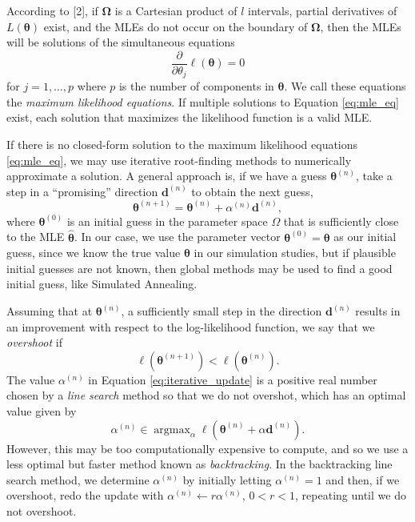 \documentclass[
]{article}
\begin{document}
According to {[}2{]}, if \(\boldsymbol{\Omega}\) is a Cartesian product
of \(l\) intervals, partial derivatives of \(L(\boldsymbol{\theta})\)
exist, and the MLEs do not occur on the boundary of
\(\boldsymbol{\Omega}\), then the MLEs will be solutions of the
simultaneous equations \begin{equation}
\label{eq:mle_eq}
\frac{\partial}{\partial \theta_j} \ell(\boldsymbol{\theta}) = 0
\end{equation} for \(j=1,\ldots,p\) where \(p\) is the number of
components in \(\boldsymbol{\theta}\). We call these equations the
\emph{maximum likelihood equations}. If multiple solutions to Equation
\eqref{eq:mle_eq} exist, each solution that maximizes the likelihood
function is a valid MLE.

If there is no closed-form solution to the maximum likelihood equations
\eqref{eq:mle_eq}, we may use iterative root-finding methods to
numerically approximate a solution. A general approach is, if we have a
guess \(\boldsymbol{\theta}^{(n)}\), take a step in a ``promising''
direction \(\boldsymbol{d}^{(n)}\) to obtain the next guess,
\begin{equation}
\label{eq:iterative_update}
\boldsymbol{\theta}^{(n+1)} = \boldsymbol{\theta}^{(n)} + \alpha^{(n)} \boldsymbol{d}^{(n)},
\end{equation} where \(\boldsymbol{\theta}^{(0)}\) is an initial guess
in the parameter space \(\Omega\) that is sufficiently close to the MLE
\(\hat{\boldsymbol{\theta}}\). In our case, we use the parameter vector
\(\boldsymbol{\theta}^{(0)} = \boldsymbol{\theta}\) as our initial
guess, since we know the true value \(\boldsymbol{\theta}\) in our
simulation studies, but if plausible initial guesses are not known, then
global methods may be used to find a good initial guess, like Simulated
Annealing.

Assuming that at \(\boldsymbol{\theta}^{(n)}\), a sufficiently small
step in the direction \(\boldsymbol{d}^{(n)}\) results in an improvement
with respect to the log-likelihood function, we say that we
\emph{overshoot} if \[
\ell(\boldsymbol{\theta}^{(n+1)}) < \ell(\boldsymbol{\theta}^{(n)}).
\] The value \(\alpha^{(n)}\) in Equation \eqref{eq:iterative_update} is
a positive real number chosen by a \emph{line search} method so that we
do not overshot, which has an optimal value given by \[
\alpha^{(n)} \in \operatorname{argmax}_{\alpha}
    \ell(\boldsymbol{\theta}^{(n)} + \alpha \boldsymbol{d}^{(n)}).
\] However, this may be too computationally expensive to compute, and so
we use a less optimal but faster method known as \emph{backtracking}. In
the backtracking line search method, we determine \(\alpha^{(n)}\) by
initially letting \(\alpha^{(n)} = 1\) and then, if we overshoot, redo
the update with \(\alpha^{(n)} \gets r \alpha^{(n)}\), \(0 < r < 1\),
repeating until we do not overshoot.
\end{document}
